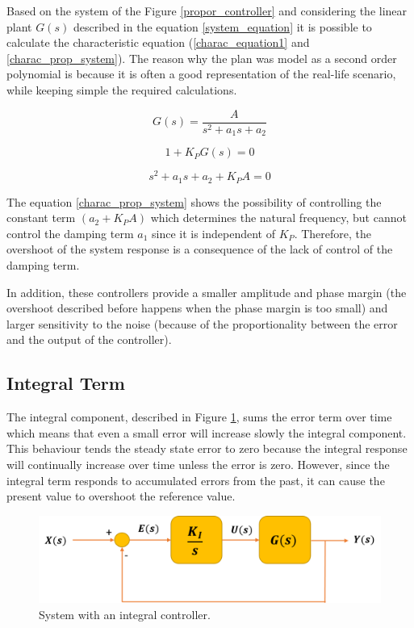 Based on the system of the Figure \ref{propor_controller} and considering the linear plant $G(s)$ described in the equation \ref{system_equation} it is possible to calculate the characteristic equation (\ref{charac_equation1} and \ref{charac_prop_system}). The reason why the plan was model as a second order polynomial is because it is often a good representation of the real-life scenario, while keeping simple the required calculations.

\begin{equation}\label{system_equation}
G(s)= \frac{A}{s^2 + a_{1}s + a_{2}}
\end{equation}

\begin{equation}\label{charac_equation1}
1 + K_PG(s)=0
\end{equation}

\begin{equation}\label{charac_prop_system}
s^2 + a_{1}s + a_{2} + K_PA=0
\end{equation}

The equation \ref{charac_prop_system} shows the possibility of controlling the constant term $(a_{2} + K_PA)$ which determines the natural frequency, but cannot control the damping term $a_{1}$ since it is independent of $K_{P}$. Therefore, the overshoot of the system response is a consequence of the lack of control of the damping term.

In addition, these controllers provide a smaller amplitude and phase margin (the overshoot described before happens when the phase margin is too small) and larger sensitivity to the noise (because of the proportionality between the error and the output of the controller).

\subsection*{Integral Term}

The integral component, described in Figure \ref{integ_controller}, sums the error term over time which means that even a small error will increase slowly the integral component. This behaviour tends the steady state error to zero because the integral response will continually increase over time unless the error is zero. However, since the integral term responds to accumulated errors from the past, it can cause the present value to overshoot the reference value.

\begin{figure}[H]
	\centering
	\includegraphics[scale=0.6]{figures/integ_controller.png}
	\caption{System with an integral controller.}
	\label{integ_controller}
\end{figure}

